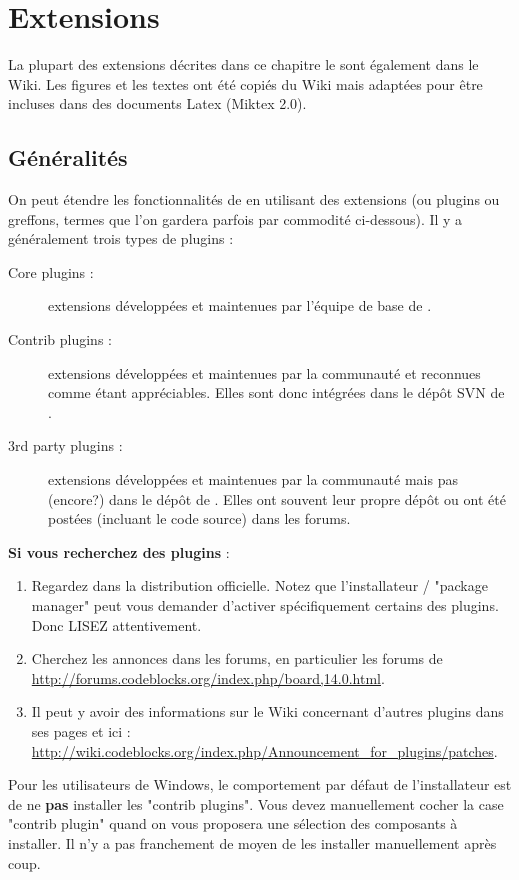 \chapter{Extensions}\label{sec:plugins}

La plupart des extensions décrites dans ce chapitre le sont également dans le Wiki. Les figures et les textes ont été copiés du Wiki mais adaptées pour être incluses dans des documents Latex (Miktex 2.0). 

\section{Généralités}

On peut étendre les fonctionnalités de \codeblocks en utilisant des extensions (ou plugins ou greffons, termes que l'on gardera parfois par commodité ci-dessous). Il y a généralement trois types de plugins :
\begin{description}
\item[Core plugins :] extensions développées et maintenues par l'équipe de base de \codeblocks.
\item[Contrib plugins :] extensions développées et maintenues par la communauté et reconnues comme étant appréciables. Elles sont donc intégrées dans le dépôt SVN de \codeblocks.
\item[3rd party plugins :] extensions développées et maintenues par la communauté mais pas (encore?) dans le dépôt de \codeblocks. Elles ont souvent leur propre dépôt ou ont été postées (incluant le code source) dans les forums.
\end{description}

\textbf{Si vous recherchez des plugins} :
\begin{enumerate}
\item Regardez dans la distribution officielle. Notez que l'installateur / "package manager" peut vous demander d'activer spécifiquement certains des plugins. Donc LISEZ attentivement.
\item Cherchez les annonces dans les forums, en particulier les forums de \url{http://forums.codeblocks.org/index.php/board,14.0.html}.
\item Il peut y avoir des informations sur le Wiki concernant d'autres plugins dans ses pages et ici : \url{http://wiki.codeblocks.org/index.php/Announcement_for_plugins/patches}.
\end{enumerate}

Pour les utilisateurs de Windows, le comportement par défaut de l'installateur est de ne \textbf{pas} installer les "contrib plugins". Vous devez manuellement cocher la case "contrib plugin" quand on vous proposera une sélection des composants à installer. Il n'y a pas franchement de moyen de les installer manuellement après coup.


